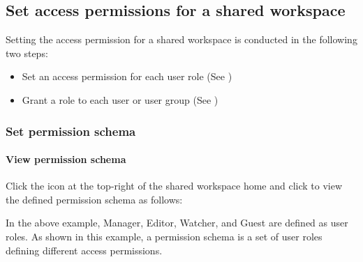 \documentclass[letterpaper,10pt,english]{sphinxmanual}
\begin{document}
\subsection{Set access permissions for a shared workspace}
\label{\detokenize{discovery/part03/shared_workspace:shared-workspace-permission}}\label{\detokenize{discovery/part03/shared_workspace:id4}}
Setting the access permission for a shared workspace is conducted in the following two steps:
\begin{itemize}
\item {} 
Set an access permission for each user role (See {\hyperref[\detokenize{discovery/part03/shared_workspace:permission-schema-setup}]{}})

\item {} 
Grant a role to each user or user group (See {\hyperref[\detokenize{discovery/part03/shared_workspace:shared-members-setup}]{}})

\end{itemize}


\subsubsection{Set permission schema}
\label{\detokenize{discovery/part03/shared_workspace:permission-schema-setup}}\label{\detokenize{discovery/part03/shared_workspace:id5}}

\paragraph{View permission schema}
\label{\detokenize{discovery/part03/shared_workspace:permission-schema-view}}\label{\detokenize{discovery/part03/shared_workspace:id6}}
Click the  icon at the top-right of the shared workspace home and click  to view the defined permission schema as follows:
\begin{quote}

\begin{figure}[H]
\centering

\noindent{}
\end{figure}
\end{quote}

In the above example, Manager, Editor, Watcher, and Guest are defined as user roles. As shown in this example, a permission schema is a set of user roles defining different access permissions.
\end{document}
